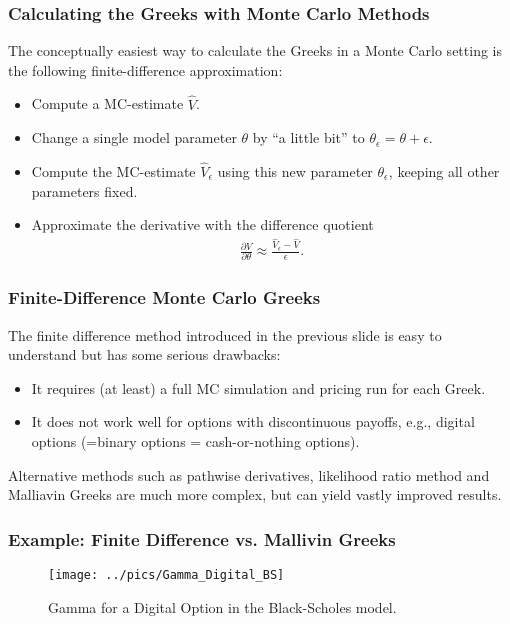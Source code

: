 \begin{frame}[fragile]
\frametitle{Calculating the Greeks with Monte Carlo Methods}
The conceptually easiest way to calculate the Greeks in a Monte Carlo setting
is the following finite-difference approximation:
\begin{itemize}
  \item Compute a MC-estimate $\hat{V}$.
  \item Change a single model parameter $\theta$ by ``a little bit'' to
  $\theta_\epsilon=\theta+\epsilon$.
  \item Compute the MC-estimate $\hat{V}_\epsilon$ using this new parameter
  $\theta_\epsilon$, keeping all other parameters fixed.
  \item Approximate the derivative with the difference quotient
   	\begin{align*}
  		\frac{\partial V}{\partial \theta} \approx \frac{\hat{V}_\epsilon
  		- \hat{V}}{\epsilon}.
	\end{align*}
\end{itemize}
\end{frame}

\begin{frame}[fragile]
\frametitle{Finite-Difference Monte Carlo Greeks}
The finite difference method introduced in the previous slide is easy to
understand but has some serious drawbacks:
\begin{itemize}
  \item It requires (at least) a full MC simulation and pricing run for each
  Greek.
  \item It does not work well for options with discontinuous
  payoffs, e.g., digital options (=binary options = cash-or-nothing options).
\end{itemize}
Alternative methods such as pathwise derivatives, likelihood ratio method and
Malliavin Greeks are much more complex, but can yield vastly improved results.
\end{frame}

\begin{frame}[fragile]
\frametitle{Example: Finite Difference vs. Mallivin Greeks}
\begin{figure}[htp]
\begin{center}
  \texttt{[image: ../pics/Gamma\_Digital\_BS]}
  \caption{Gamma for a Digital Option in the Black-Scholes model.}
\end{center}
\end{figure}
\end{frame}

